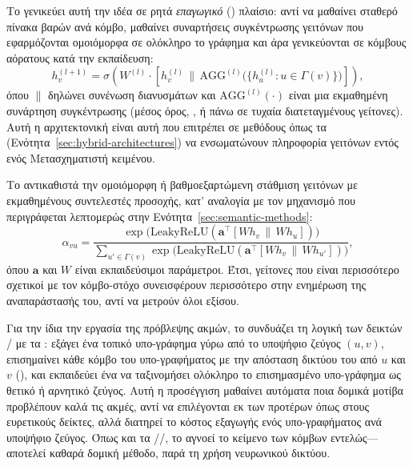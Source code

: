 Το \textbf{} \cite{hamilton2017graphsage} γενικεύει αυτή την ιδέα σε
ρητά \textit{επαγωγικό} () πλαίσιο: αντί να μαθαίνει σταθερό πίνακα
βαρών ανά κόμβο, μαθαίνει συναρτήσεις συγκέντρωσης γειτόνων που εφαρμόζονται
ομοιόμορφα σε ολόκληρο το γράφημα και άρα γενικεύονται σε κόμβους αόρατους κατά την
εκπαίδευση:
\begin{equation}
    h_v^{(l+1)} = \sigma\!\left(W^{(l)} \cdot \left[h_v^{(l)} \, \| \, \mathrm{AGG}^{(l)}\bigl(\{h_u^{(l)} : u \in \Gamma(v)\}\bigr)\right]\right),
    \label{eq:graphsage}
\end{equation}
όπου $\|$ δηλώνει συνένωση διανυσμάτων και $\mathrm{AGG}^{(l)}(\cdot)$ είναι μια
εκμαθημένη συνάρτηση συγκέντρωσης (μέσος όρος, , ή  πάνω σε
τυχαία διατεταγμένους γείτονες).
Αυτή η αρχιτεκτονική είναι αυτή που επιτρέπει σε
μεθόδους όπως τα  (Ενότητα~\ref{sec:hybrid-architectures}) να
ενσωματώνουν πληροφορία γειτόνων εντός ενός Μετασχηματιστή κειμένου.

Το \textbf{} \cite{velickovic2018gat} αντικαθιστά
την ομοιόμορφη ή βαθμοεξαρτώμενη στάθμιση γειτόνων με εκμαθημένους συντελεστές
προσοχής, κατ' αναλογία με τον μηχανισμό  που περιγράφεται
λεπτομερώς στην Ενότητα~\ref{sec:semantic-methods}:
\begin{equation}
    \alpha_{vu} = \frac{\exp\bigl(\mathrm{LeakyReLU}(\mathbf{a}^\top [W h_v \, \| \, W h_u])\bigr)}
    {\sum_{u' \in \Gamma(v)} \exp\bigl(\mathrm{LeakyReLU}(\mathbf{a}^\top [W h_v \, \| \, W h_{u'}])\bigr)},
    \label{eq:gat}
\end{equation}
όπου $\mathbf{a}$ και $W$ είναι εκπαιδεύσιμοι παράμετροι.
Έτσι, γείτονες που είναι
περισσότερο σχετικοί με τον κόμβο-στόχο συνεισφέρουν περισσότερο στην ενημέρωση της
αναπαράστασής του, αντί να μετρούν όλοι εξίσου.

Για την ίδια την εργασία της πρόβλεψης ακμών, το \textbf{}
\cite{zhangchen2018seal} συνδυάζει τη λογική των δεικτών / με τα
: εξάγει ένα τοπικό υπο-γράφημα γύρω από το υποψήφιο ζεύγος $(u, v)$,
επισημαίνει κάθε κόμβο του υπο-γραφήματος με την απόσταση δικτύου του από $u$ και $v$
(), και εκπαιδεύει ένα  να ταξινομήσει
ολόκληρο το επισημασμένο υπο-γράφημα ως θετικό ή αρνητικό ζεύγος.
Αυτή η προσέγγιση
μαθαίνει αυτόματα ποια δομικά μοτίβα προβλέπουν καλά τις ακμές, αντί να επιλέγονται
εκ των προτέρων όπως στους ευρετικούς δείκτες, αλλά διατηρεί το κόστος εξαγωγής ενός
υπο-γραφήματος ανά υποψήφιο ζεύγος.
Όπως και τα //, το  αγνοεί το κείμενο των
κόμβων εντελώς---αποτελεί καθαρά δομική μέθοδο, παρά τη χρήση νευρωνικού δικτύου.


